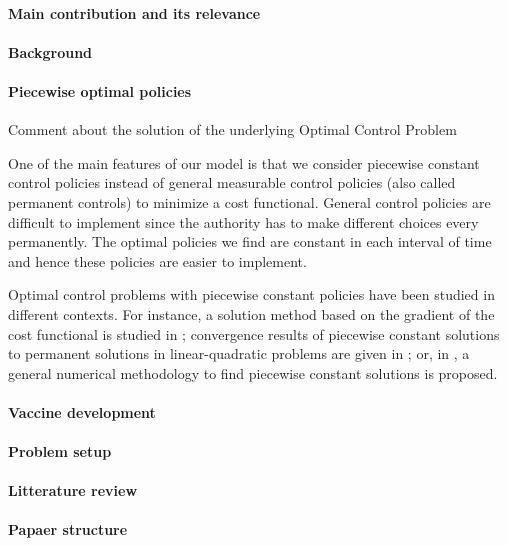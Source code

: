 \paragraph{Main contribution and its relevance}
\paragraph{Background}
\paragraph{Piecewise optimal policies}
    Comment about the solution of the underlying Optimal Control Problem
    
One of the main features of our model is that we consider piecewise constant control policies instead of general measurable control policies (also called permanent controls) to minimize a cost functional. General control policies are difficult to implement since the authority has to make different choices every permanently. The optimal policies we find are constant in each interval of time and hence these policies are easier to implement. 

Optimal control problems with piecewise constant policies have been studied in different contexts. For instance, a solution method based on the gradient of the cost functional is studied in \cite{MR3223602}; convergence results of  piecewise constant solutions to permanent solutions in linear-quadratic problems are given in \cite{MR3627992}; or, in \cite{CANTUNetAl}, a general numerical methodology to find piecewise constant solutions is proposed. 


\paragraph{Vaccine development}
\paragraph{Problem setup}
\paragraph{Litterature review}
\paragraph{Papaer structure}